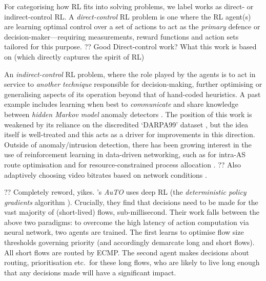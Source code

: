 \documentclass[conference, letterpaper, 10pt, times]{IEEEtran}
\begin{document}
For categorising how RL fits into solving problems, we label works as direct- or indirect-control RL.
A \emph{direct-control} RL problem is one where the RL agent(s) are learning optimal control over a set of actions to act as the \emph{primary} defence or decision-maker---requiring measurements, reward functions and action sets tailored for this purpose.
?? Good Direct-control work? What this work is based on (which directly captures the spirit of RL) \cite{DBLP:phd/ethos/Malialis14, DBLP:journals/eaai/MalialisK15}

An \emph{indirect-control} RL problem, where the role played by the agents is to act in service to \emph{another technique} responsible for decision-making, further optimising or generalising aspects of its operation beyond that of hand-coded heuristics.
A past example includes learning when best to \emph{communicate} and share knowledge between \emph{hidden Markov model} anomaly detectors \cite{DBLP:conf/paisi/XuSH07}.
The position of this work is weakened by its reliance on the discredited `DARPA99' dataset \cite{DARPA-IDD, DBLP:conf/cisda/TavallaeeBLG09, DBLP:conf/sp/SommerP10}, but the idea itself is well-treated and this acts as a driver for improvements in this direction.
Outside of anomaly/intrusion detection, there has been growing interest in the use of reinforcement learning in data-driven networking, such as for intra-AS route optimisation \cite{DBLP:conf/hotnets/ValadarskySST17} and for resource-constrained process allocation \cite{DBLP:conf/hotnets/MaoAMK16}.
?? Also adaptively choosing video bitrates based on network conditions \cite{DBLP:conf/sigcomm/MaoNA17}.

?? Completely reword, yikes.
\citeauthor{DBLP:conf/sigcomm/ChenL0L18}'s \emph{AuTO} \cite{DBLP:conf/sigcomm/ChenL0L18} uses deep RL (the \emph{deterministic policy gradients} algorithm \cite{DBLP:conf/icml/SilverLHDWR14}).
Crucially, they find that decisions need to be made for the vast majority of (short-lived) flows, sub-millisecond.
Their work falls between the above two paradigms: to overcome the high latency of action computation via neural network, two agents are trained.
The first learns to optimise flow size thresholds governing priority (and accordingly demarcate long and short flows).
All short flows are routed by ECMP.
The second agent makes decisions about routing, prioritisation etc.\ for these long flows, who are likely to live long enough that any decisions made will have a significant impact.
\end{document}
